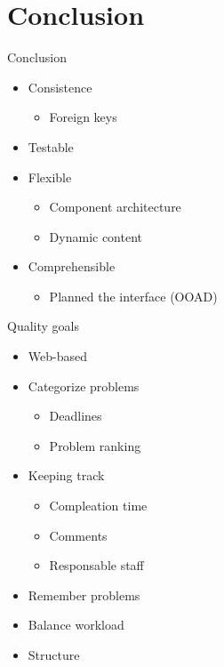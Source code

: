 \section*{Conclusion}
\begin{frame}{Conclusion}

\begin{itemize}
	\item Consistence
	\begin{itemize}
		\item Foreign keys
	\end{itemize}
	\item Testable 
	\item Flexible
	\begin{itemize}
		\item Component architecture
		\item Dynamic content
	\end{itemize}
	\item Comprehensible
	\begin{itemize}
		\item Planned the interface (OOAD)
	\end{itemize}
\end{itemize}
\end{frame}

\begin{frame}
Quality goals
	\begin{itemize}
	\item Web-based 
	\item Categorize problems
	\begin{itemize}
		\item Deadlines
		\item Problem ranking
	\end{itemize}
	\item Keeping track
	\begin{itemize}
		\item Compleation time
		\item Comments
		\item Responsable staff
	\end{itemize}	
	\item Remember problems
	\item Balance workload
	\item Structure
\end{itemize}
\end{frame}